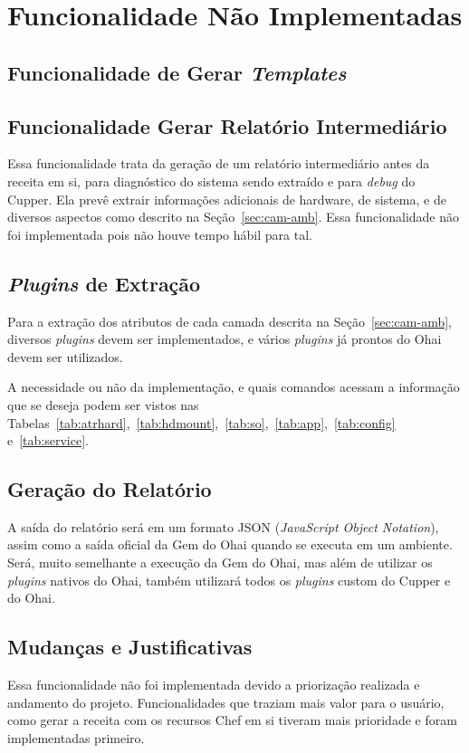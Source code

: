\section{Funcionalidade Não Implementadas}
\label{sec:rel}

\subsection{Funcionalidade de Gerar \textit{Templates}}

\subsection{Funcionalidade Gerar Relatório Intermediário}
Essa funcionalidade trata da geração de um relatório intermediário antes da
receita em si, para diagnóstico do sistema sendo extraído e para \textit{debug} do
Cupper. Ela prevê extrair informações adicionais de hardware, de sistema, e de
diversos aspectos como descrito na Seção~\ref{sec:cam-amb}. Essa funcionalidade
não foi implementada pois não houve tempo hábil para tal.

\subsection{\textit{Plugins} de Extração}
Para a extração dos atributos de cada camada descrita na Seção~\ref{sec:cam-amb},
diversos \textit{plugins} devem ser implementados, e vários \textit{plugins} já prontos do Ohai
devem ser utilizados.

A necessidade ou não da implementação, e quais comandos acessam a informação
que se deseja podem ser vistos nas Tabelas~\ref{tab:atrhard},~\ref{tab:hdmount},~\ref{tab:so},~\ref{tab:app},~\ref{tab:config} e~\ref{tab:service}.

\subsection{Geração do Relatório}
A saída do relatório será em um formato JSON (\textit{JavaScript Object Notation}),
assim como a saída oficial da Gem do Ohai quando se executa em um ambiente. Será,
muito semelhante a execução da Gem do Ohai, mas além de utilizar os \textit{plugins} nativos
do Ohai, também utilizará todos os \textit{plugins} custom do Cupper e do Ohai.

\subsection{Mudanças e Justificativas}
Essa funcionalidade não foi implementada devido a priorização realizada e andamento
do projeto. Funcionalidades que traziam mais valor para o usuário, como 
gerar a receita com os recursos Chef em si tiveram mais prioridade e foram implementadas
primeiro.
